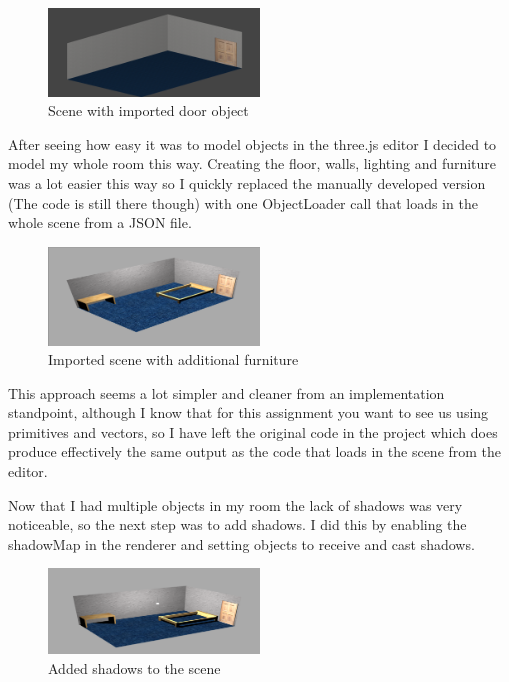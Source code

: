 \documentclass[runningheads,a4paper]{llncs}
\begin{document}
  \begin{figure}[H]
    \centering
    \includegraphics[width=0.5\textwidth]{images/4.png}
    \caption{Scene with imported door object}
    \label{fig:window}
  \end{figure}


  After seeing how easy it was to model objects in the three.js editor I decided to model my whole room this way. Creating the floor, walls, lighting and furniture was a lot easier this way so I quickly replaced the manually developed version (The code is still there though) with one ObjectLoader call that loads in the whole scene from a JSON file. 

  \begin{figure}[H]
    \centering
    \includegraphics[width=0.5\textwidth]{images/5.png}
    \caption{Imported scene with additional furniture}
    \label{fig:window}
  \end{figure}

  This approach seems a lot simpler and cleaner from an implementation standpoint, although I know that for this assignment you want to see us using primitives and vectors, so I have left the original code in the project which does produce effectively the same output as the code that loads in the scene from the editor. 

  Now that I had multiple objects in my room the lack of shadows was very noticeable, so the next step was to add shadows. I did this by enabling the shadowMap in the renderer and setting objects to receive and cast shadows.

  \begin{figure}[H]
    \centering
    \includegraphics[width=0.5\textwidth]{images/6.png}
    \caption{Added shadows to the scene}
    \label{fig:window}
  \end{figure}
\end{document}
